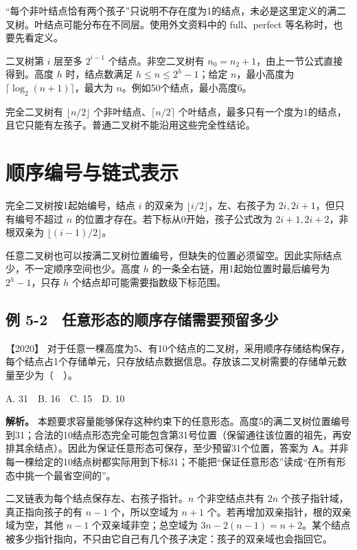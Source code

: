 ``每个非叶结点恰有两个孩子''只说明不存在度为1的结点，未必是这里定义的满二叉树。叶结点可能分布在不同层。使用外文资料中的 full、perfect 等名称时，也要先看定义。

二叉树第 \(i\) 层至多 \(2^{i-1}\) 个结点。非空二叉树有 \(n_0=n_2+1\)，由上一节公式直接得到。高度 \(h\) 时，结点数满足 \(h\le n\le2^h-1\)；给定 \(n\)，最小高度为 \(\lceil\log_2(n+1)\rceil\)，最大为 \(n\)。例如50个结点，最小高度6。

完全二叉树有 \(\lfloor n/2\rfloor\) 个非叶结点、\(\lceil n/2\rceil\) 个叶结点，最多只有一个度为1的结点，且它只能有左孩子。普通二叉树不能沿用这些完全性结论。

\section{顺序编号与链式表示}\label{ds-05-03}

完全二叉树按1起始编号，结点 \(i\) 的双亲为 \(\lfloor i/2\rfloor\)，左、右孩子为 \(2i,2i+1\)，但只有编号不超过 \(n\) 的位置才存在。若下标从0开始，孩子公式改为 \(2i+1,2i+2\)，非根双亲为 \(\lfloor(i-1)/2\rfloor\)。

任意二叉树也可以按满二叉树位置编号，但缺失的位置必须留空。因此实际结点少，不一定顺序空间也少。高度 \(h\) 的一条全右链，用1起始位置时最后编号为 \(2^h-1\)，只存 \(h\) 个结点却可能需要指数级下标范围。

\subsection{例 5-2　任意形态的顺序存储需要预留多少}\label{ds-ex5-2}

\noindent{}【2020】 对于任意一棵高度为5、有10个结点的二叉树，采用顺序存储结构保存，每个结点占1个存储单元，只存放结点数据信息。存放该二叉树需要的存储单元数量至少为（　）。

A. 31　B. 16　C. 15　D. 10


\textbf{解析。} 本题要求容量能够保存这种约束下的任意形态。高度5的满二叉树位置编号到31；合法的10结点形态完全可能包含第31号位置（保留通往该位置的祖先，再安排其余结点）。因此为保证任意形态可保存，至少预留31个位置，答案为 \textbf{A}。并非每一棵给定的10结点树都实际用到下标31；不能把``保证任意形态''读成``在所有形态中挑一个最省空间的''。

二叉链表为每个结点保存左、右孩子指针。\(n\) 个非空结点共有 \(2n\) 个孩子指针域，真正指向孩子的有 \(n-1\) 个，所以空域为 \(n+1\) 个。若再增加双亲指针，根的双亲域为空，其他 \(n-1\) 个双亲域非空；总空域为 \(3n-2(n-1)=n+2\)。某个结点被多少指针指向，不只由它自己有几个孩子决定：孩子的双亲域也会指回它。

